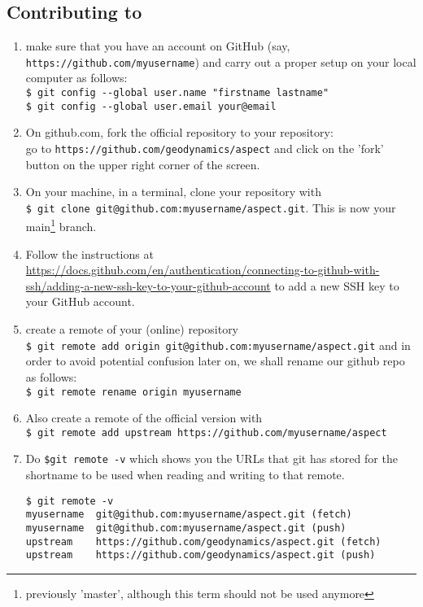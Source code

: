 
\subsection{Contributing to \aspect}

\begin{enumerate}
\item make sure that you  have an account on GitHub (say, \verb"https://github.com/myusername") 
and carry out a proper setup on your local computer as follows:\\
\verb'$ git config --global user.name "firstname lastname" '\\
\verb'$ git config --global user.email your@email'

\item On github.com, fork the official \aspect repository to your repository:\\
go to \verb"https://github.com/geodynamics/aspect"
and click on the 'fork' button on the upper right corner of the screen.

\item On your machine, in a terminal, clone your repository with \\
\verb"$ git clone git@github.com:myusername/aspect.git". 
This is now your main\footnote{previously 'master', although this term should not be used anymore} branch.

\item 
Follow the instructions at \url{https://docs.github.com/en/authentication/connecting-to-github-with-ssh/adding-a-new-ssh-key-to-your-github-account}
to add a new SSH key to your GitHub account.
 
\item create a remote of your (online) repository\\
\verb"$ git remote add origin git@github.com:myusername/aspect.git"
and in order to avoid potential confusion later on, we shall rename our github repo as follows:\\
\verb"$ git remote rename origin myusername" 

\item Also create a remote of the official version with\\
\verb"$ git remote add upstream https://github.com/myusername/aspect"

\item Do \verb"$git remote -v" which shows you the URLs that git 
has stored for the shortname to be used when reading and writing to that remote.
\begin{verbatim}
$ git remote -v
myusername	git@github.com:myusername/aspect.git (fetch)
myusername	git@github.com:myusername/aspect.git (push)
upstream	https://github.com/geodynamics/aspect.git (fetch)
upstream	https://github.com/geodynamics/aspect.git (push)
\end{verbatim}

\end{enumerate}


